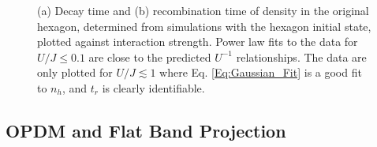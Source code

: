 \begin{figure}[ht!]
    \centering
    \hfill
    \caption{(a) Decay time and (b) recombination time of density in the original hexagon, determined from simulations with the hexagon initial state, plotted against interaction strength. Power law fits to the data for $U/J\leq 0.1$ are close to the predicted $U^{-1}$ relationships. The data are only plotted for $U/J\lesssim 1$ where Eq. \ref{Eq:Gaussian_Fit} is a good fit to $n_{h}$, and $t_r$ is clearly identifiable.}
    \label{Fig:Decay_and_Recombination_Time}
\end{figure}
\text{}%

\subsection{OPDM and Flat Band Projection}\label{Sec:FBProjection}

